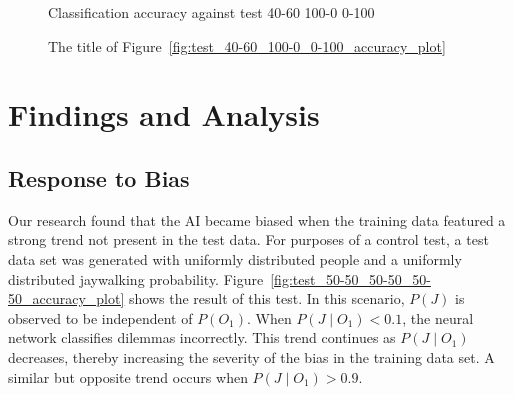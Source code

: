\documentclass{report}
\begin{document}
\begin{figure}[h]
    \centering
    Classification accuracy against test 40-60 100-0 0-100
    \caption{The title of Figure~\ref{fig:test_40-60_100-0_0-100_accuracy_plot}}
    \label{fig:test_result_naming_example}
\end{figure}

\FloatBarrier
\chapter{Findings and Analysis}

\section{Response to Bias}

Our research found that the AI became biased when the training data featured a strong trend not
present in the test data. For purposes of a control test, a test data set was generated with
uniformly distributed people and a uniformly distributed jaywalking probability.
Figure~\ref{fig:test_50-50_50-50_50-50_accuracy_plot} shows the result of this test. In this
scenario, $P(J)$ is observed to be independent of $P(O_1)$. When $P(J \mid O_1) < 0.1$, the neural
network classifies dilemmas incorrectly. This trend continues as $P(J \mid O_1)$ decreases, thereby
increasing the severity of the bias in the training data set. A similar but opposite trend occurs
when $P(J \mid O_1) > 0.9$.
\end{document}
